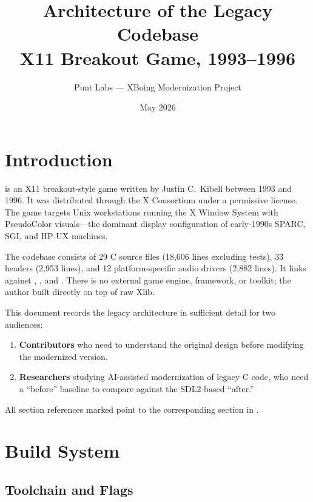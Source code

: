 \documentclass[11pt,a4paper]{article}
\title{\LARGE Architecture of the Legacy \xboing{} Codebase\\[6pt]
       \large X11 Breakout Game, 1993--1996}
\author{Punt Labs --- XBoing Modernization Project}
\date{May 2026}
\begin{document}
\maketitle

\tableofcontents
\newpage

\section{Introduction}
\label{sec:introduction}

\xboing{} is an X11 breakout-style game written by Justin C.\ Kibell between 1993 and 1996. It was distributed through the X Consortium under a permissive license. The game targets Unix workstations running the X Window System with PseudoColor visuals---the dominant display configuration of early-1990s SPARC, SGI, and HP-UX machines.

The codebase consists of 29 C source files (18,606 lines excluding tests), 33 headers (2,953 lines), and 12 platform-specific audio drivers (2,882 lines). It links against , , and . There is no external game engine, framework, or toolkit; the author built directly on top of raw Xlib.

This document records the legacy architecture in sufficient detail for two audiences:
\begin{enumerate}[label=\arabic*.]
  \item \textbf{Contributors} who need to understand the original design before modifying the modernized version.
  \item \textbf{Researchers} studying AI-assisted modernization of legacy C code, who need a ``before'' baseline to compare against the SDL2-based ``after.''
\end{enumerate}

All section references marked  point to the corresponding section in .

\section{Build System}
\label{sec:build-system}

\subsection{Toolchain and Flags}
\label{sec:build-flags}
\end{document}
